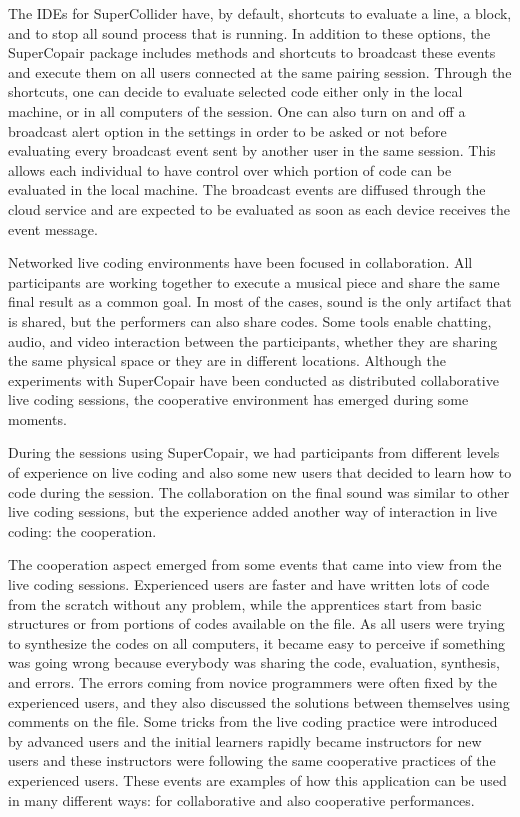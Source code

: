 The IDEs for SuperCollider have, by default, shortcuts to evaluate a line, a block, and to stop all sound process that is running.
In addition to these options, the SuperCopair package includes methods and shortcuts to broadcast these events and execute them on all users connected at the same pairing session.
Through the shortcuts, one can decide to evaluate selected code either only in the local machine, or in all computers of the session.
One can also turn on and off a broadcast alert option in the settings in order to be asked or not before evaluating every broadcast event sent by another user in the same session. 
This allows each individual to have control over which portion of code can be evaluated in the local machine.
The broadcast events are diffused through the cloud service and are expected to be evaluated as soon as each device receives the event message.

Networked live coding environments have been focused in collaboration.
All participants are working together to execute a musical piece and share the same final result as a common goal.
In most of the cases, sound is the only artifact that is shared, but the performers can also share codes.
Some tools enable chatting, audio, and video interaction between the participants, whether they are sharing the same physical space or they are in different locations.
Although the experiments with SuperCopair have been conducted as distributed collaborative live coding sessions, the cooperative environment has emerged during some moments.

During the sessions using SuperCopair, we had participants from different levels of experience on live coding and also some new users that decided to learn how to code during the session.
The collaboration on the final sound was similar to other live coding sessions, but the experience added another way of interaction in live coding: the cooperation. 

The cooperation aspect emerged from some events that came into view from the live coding sessions.
Experienced users are faster and have written lots of code from the scratch without any problem, while the apprentices start from basic structures or from portions of codes available on the file.
As all users were trying to synthesize the codes on all computers, it became easy to perceive if something was going wrong because everybody was sharing the code, evaluation, synthesis, and errors.
The errors coming from novice programmers were often fixed by the experienced users, and they also discussed the solutions between themselves using comments on the file.
Some tricks from the live coding practice were introduced by advanced users and the initial learners rapidly became instructors for new users and these instructors were following the same cooperative practices of the experienced users.
These events are examples of how this application can be used in many different ways: for collaborative and also cooperative performances.


